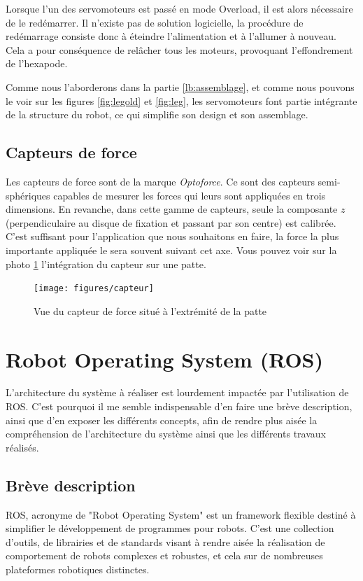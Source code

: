 \documentclass{tnreport}
\begin{document}
Lorsque l'un des \glspl{servomoteur} est passé en mode Overload, il est alors nécessaire de le redémarrer. Il n'existe pas de solution logicielle, la procédure de redémarrage consiste donc à éteindre l'alimentation et à l'allumer à nouveau. Cela a pour conséquence de relâcher tous les moteurs, provoquant l'effondrement de l'hexapode.

Comme nous l'aborderons dans la partie \ref{lb:assemblage}, et comme nous pouvons le voir sur les figures \ref{fig:legold} et \ref{fig:leg}, les \glspl{servomoteur} font partie intégrante de la structure du robot, ce qui simplifie son design et son assemblage. 

\subsection{Capteurs de force}\label{lb:forcesensor}

Les capteurs de force sont de la marque \textit{Optoforce}. Ce sont des capteurs semi-sphériques capables de mesurer les forces qui leurs sont appliquées en trois dimensions. En revanche, dans cette gamme de capteurs, seule la composante $z$ (perpendiculaire au disque de fixation et passant par son centre) est calibrée. C'est suffisant pour l'application que nous souhaitons en faire, la force la plus importante appliquée le sera souvent suivant cet axe. Vous pouvez voir sur la photo \ref{fig:sensor} l'intégration du capteur sur une patte. 

\begin{figure}[h]
    \centering
    \texttt{[image: figures/capteur]}
    \caption{Vue du capteur de force situé à l'extrémité de la patte}
    \label{fig:sensor}
\end{figure}
\clearpage
\section{Robot Operating System (ROS)} 
L'architecture du système à réaliser est lourdement impactée par l'utilisation de ROS. C'est pourquoi il me semble indispensable d'en faire une brève description, ainsi que d'en exposer les différents concepts, afin de rendre plus aisée la compréhension de l'architecture du système ainsi que les différents travaux réalisés. 
\subsection{Brève description}
 ROS, acronyme de "Robot Operating System" est un framework flexible destiné à simplifier le développement de programmes pour robots. C'est une collection d'outils, de librairies et de standards visant à rendre aisée la réalisation de comportement de robots complexes et robustes, et cela sur de nombreuses plateformes robotiques distinctes.
\end{document}
